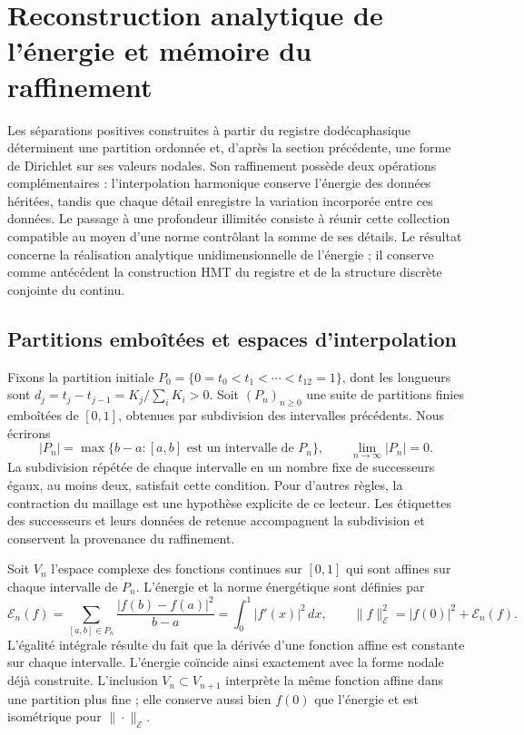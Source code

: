 \section{Reconstruction analytique de l’énergie et mémoire du raffinement}
\label{sec:limite-energetico-k}

Les séparations positives construites à partir du registre dodécaphasique déterminent une partition ordonnée et, d'après la section précédente, une forme de Dirichlet sur ses valeurs nodales. Son raffinement possède deux opérations complémentaires : l'interpolation harmonique conserve l'énergie des données héritées, tandis que chaque détail enregistre la variation incorporée entre ces données. Le passage à une profondeur illimitée consiste à réunir cette collection compatible au moyen d'une norme contrôlant la somme de ses détails. Le résultat concerne la réalisation analytique unidimensionnelle de l'énergie ; il conserve comme antécédent la construction HMT du registre et de la structure discrète conjointe du continu.

\subsection{Partitions emboîtées et espaces d’interpolation}

Fixons la partition initiale
\(P_0=\{0=t_0<t_1<\cdots<t_{12}=1\}\), dont les longueurs sont
\(d_j=t_j-t_{j-1}=K_j/\sum_iK_i>0\). Soit
\((P_n)_{n\geq0}\) une suite de partitions finies emboîtées de
\([0,1]\), obtenues par subdivision des intervalles précédents.
Nous écrirons
\[
 |P_n|=\max\{b-a:[a,b]\text{ est un intervalle de }P_n\},
 \qquad \lim_{n\to\infty}|P_n|=0.
\]
La subdivision répétée de chaque intervalle en un nombre fixe de successeurs égaux, au moins deux, satisfait cette condition. Pour d'autres règles, la contraction du maillage est une hypothèse explicite de ce lecteur. Les étiquettes des successeurs et leurs données de retenue accompagnent la subdivision et conservent la provenance du raffinement.

Soit \(V_n\) l’espace complexe des fonctions continues sur \([0,1]\)
qui sont affines sur chaque intervalle de \(P_n\). L’énergie et la norme
énergétique sont définies par
\begin{equation}
 \mathcal E_n(f)
 =\sum_{[a,b]\in P_n}\frac{|f(b)-f(a)|^2}{b-a}
 =\int_0^1|f'(x)|^2\,dx,
 \qquad
 \|f\|_{\mathcal E}^2=|f(0)|^2+\mathcal E_n(f).
 \label{eq:energia-afines-k}
\end{equation}
L’égalité intégrale résulte du fait que la dérivée d’une fonction affine est
constante sur chaque intervalle. L’énergie coïncide ainsi exactement avec
la forme nodale déjà construite. L’inclusion \(V_n\subset V_{n+1}\)
interprète la même fonction affine dans une partition plus fine ; elle conserve
aussi bien \(f(0)\) que l’énergie et est isométrique pour
\(\|\cdot\|_{\mathcal E}\).

